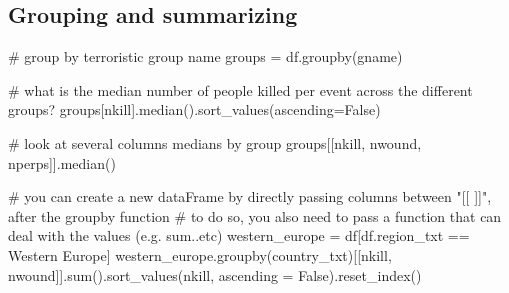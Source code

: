 \documentclass[
  letterpaper,
  DIV=11,
  numbers=noendperiod]{scrreprt}
\newenvironment{Shaded}{\begin{snugshade}}{\end{snugshade}}
\newcommand{\BuiltInTok}[1]{\textcolor[rgb]{0.00,0.23,0.31}{#1}}
\newcommand{\CommentTok}[1]{\textcolor[rgb]{0.37,0.37,0.37}{#1}}
\newcommand{\NormalTok}[1]{\textcolor[rgb]{0.00,0.23,0.31}{#1}}
\newcommand{\OperatorTok}[1]{\textcolor[rgb]{0.37,0.37,0.37}{#1}}
\newcommand{\StringTok}[1]{\textcolor[rgb]{0.13,0.47,0.30}{#1}}
\newcommand{\VariableTok}[1]{\textcolor[rgb]{0.07,0.07,0.07}{#1}}
\begin{document}
\hypertarget{grouping-and-summarizing}{%
\subsection{Grouping and summarizing}\label{grouping-and-summarizing}}

\begin{Shaded}
\begin{Highlighting}[]
\CommentTok{\# group by terroristic group name}
\NormalTok{groups }\OperatorTok{=}\NormalTok{ df.groupby(}\StringTok{\textquotesingle{}gname\textquotesingle{}}\NormalTok{)}
\end{Highlighting}
\end{Shaded}

\begin{Shaded}
\begin{Highlighting}[]
\CommentTok{\# what is the median number of people killed per event across the different groups?}
\NormalTok{groups[}\StringTok{\textquotesingle{}nkill\textquotesingle{}}\NormalTok{].median().sort\_values(ascending}\OperatorTok{=}\VariableTok{False}\NormalTok{)}
\end{Highlighting}
\end{Shaded}

\begin{Shaded}
\begin{Highlighting}[]
\CommentTok{\# look at several columns\textquotesingle{} medians by group}
\NormalTok{groups[[}\StringTok{\textquotesingle{}nkill\textquotesingle{}}\NormalTok{, }\StringTok{\textquotesingle{}nwound\textquotesingle{}}\NormalTok{, }\StringTok{\textquotesingle{}nperps\textquotesingle{}}\NormalTok{]].median()}
\end{Highlighting}
\end{Shaded}

\begin{Shaded}
\begin{Highlighting}[]
\CommentTok{\# you can create a new dataFrame by directly passing columns between "[[ ]]", after the groupby function}
\CommentTok{\# to do so, you also need to pass a function that can deal with the values (e.g. sum..etc) }
\NormalTok{western\_europe }\OperatorTok{=}\NormalTok{ df[df.region\_txt }\OperatorTok{==} \StringTok{\textquotesingle{}Western Europe\textquotesingle{}}\NormalTok{]}
\NormalTok{western\_europe.groupby(}\StringTok{\textquotesingle{}country\_txt\textquotesingle{}}\NormalTok{)[[}\StringTok{\textquotesingle{}nkill\textquotesingle{}}\NormalTok{, }\StringTok{\textquotesingle{}nwound\textquotesingle{}}\NormalTok{]].}\BuiltInTok{sum}\NormalTok{().sort\_values(}\StringTok{\textquotesingle{}nkill\textquotesingle{}}\NormalTok{, ascending }\OperatorTok{=} \VariableTok{False}\NormalTok{).reset\_index()}
\end{Highlighting}
\end{Shaded}
\end{document}
